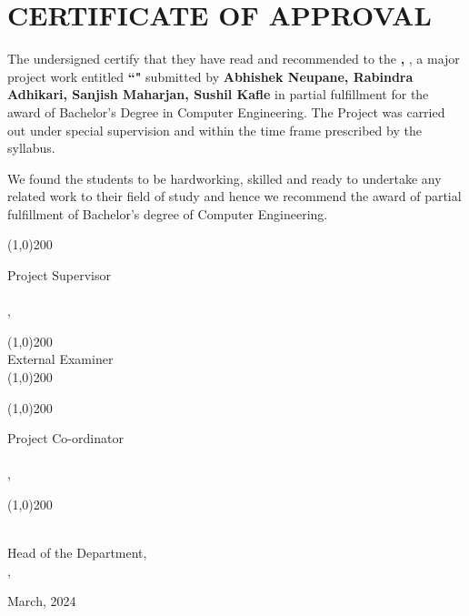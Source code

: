 \section*{CERTIFICATE OF APPROVAL}

\vspace{0.5cm}

The undersigned certify that they have read and recommended to the \textbf{\thedepartment,  \thecampus}, a major
project work entitled \textbf{“\thetitle"} submitted by \textbf{Abhishek Neupane, Rabindra Adhikari, Sanjish Maharjan, Sushil Kafle} in partial fulfillment for the award of Bachelor’s
Degree in Computer Engineering. The Project was carried out
under special supervision and within the time frame prescribed by the syllabus.

\vspace{1cm}

\noindent We found the students to be hardworking, skilled and ready to undertake any related
work to their field of study and hence we recommend the award of partial fulfillment
of Bachelor’s degree of Computer Engineering.

\vspace{1cm}

\noindent \line(1,0){200}

\noindent Project Supervisor \\
\thesupervisor \\
\thedepartment, \thecampus


\vspace{1cm}
\noindent \line(1,0){200}\\
\noindent External Examiner \\
\noindent \line(1,0){200}\\
\vspace{1cm}

\noindent \line(1,0){200}

\noindent Project Co-ordinator \\
\theprogramcoordinator \\
\thedepartment, \thecampus

\vspace{1cm}

\noindent \line(1,0){200}

\noindent \theHOD \\
Head of the Department, \\
\thedepartment, \thecampus

\vspace{1cm}

\noindent March, 2024

